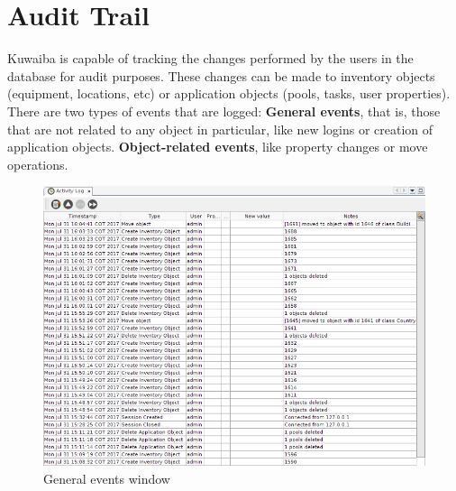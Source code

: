 \documentclass[a4paper]{article}
\begin{document}
	\clearpage
	\section{Audit Trail} \label{sec:audit_trail}
	Kuwaiba is capable of tracking the changes performed by the users in the database for audit purposes. These changes can be made to inventory objects (equipment, locations, etc) or application objects (pools, tasks, user properties). There are two types of events that are logged: \textbf{General events}, that is, those that are not related to any object in particular, like new logins or creation of application objects. \textbf{Object-related events}, like property changes or move operations.
	\begin{figure}[h!]
		\centering
		\includegraphics[width=\linewidth]{img/audit_trail_general_events.png}
		\caption{General events window}
		\label{fig:audit_trail_general_events}
	\end{figure}
	
\end{document}
